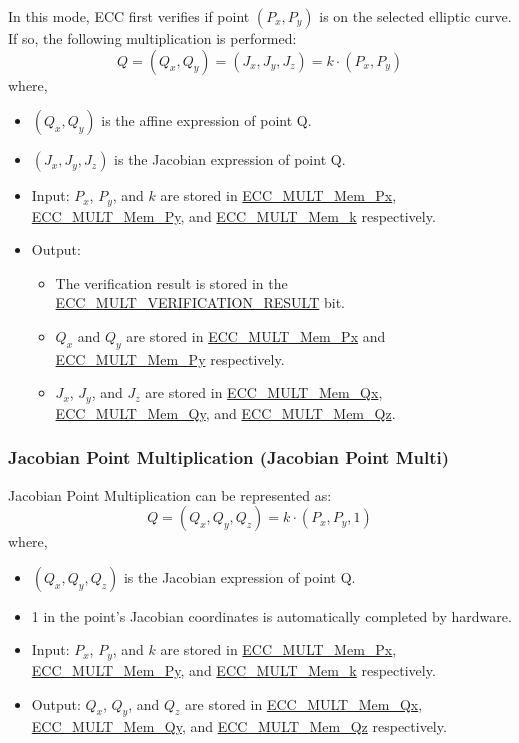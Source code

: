 \documentclass[main\_\_EN.tex]{subfiles}
\begin{document}
In this mode, ECC first verifies if point $(P_x,P_y)$ is on the selected elliptic curve. If so, the following multiplication is performed:
\[
Q = (Q_x,Q_y) = (J_x,J_y,J_z) = k \cdot (P_x,P_y)
\]
where,
\begin{itemize}
    \item $(Q_x,Q_y)$ is the affine expression of point Q.
    \item $(J_x,J_y,J_z)$ is the Jacobian expression of point Q.
    \item Input: $P_x$, $P_y$, and $k$ are stored in \hyperref[tab:ecc-memory]{ECC\_MULT\_Mem\_Px}, \hyperref[tab:ecc-memory]{ECC\_MULT\_Mem\_Py}, and \hyperref[tab:ecc-memory]{ECC\_MULT\_Mem\_k} respectively.
    \item Output:
    \begin{itemize}
        \item The verification result is stored in the \hyperref[fielddesc:ECCMULTVERIFICATIONRESULT]{ECC\_MULT\_VERIFICATION\_RESULT} bit.
        \item $Q_x$ and $Q_y$ are stored in \hyperref[tab:ecc-memory]{ECC\_MULT\_Mem\_Px} and \hyperref[tab:ecc-memory]{ECC\_MULT\_Mem\_Py} respectively.
        \item $J_x$, $J_y$, and $J_z$ are stored in \hyperref[tab:ecc-memory]{ECC\_MULT\_Mem\_Qx}, \hyperref[tab:ecc-memory]{ECC\_MULT\_Mem\_Qy}, and \hyperref[tab:ecc-memory]{ECC\_MULT\_Mem\_Qz}.
    \end{itemize}
\end{itemize}

\subsubsection{Jacobian Point Multiplication (Jacobian Point Multi)}

Jacobian Point Multiplication can be represented as:
\[
Q = (Q_x,Q_y,Q_z) = k \cdot (P_x,P_y,1)
\]
where,
\begin{itemize}
    \item $(Q_x,Q_y,Q_z)$ is the Jacobian expression of point Q.
    \item 1 in the point's Jacobian coordinates is automatically completed by hardware.
    \item Input: $P_x$, $P_y$, and $k$ are stored in \hyperref[tab:ecc-memory]{ECC\_MULT\_Mem\_Px}, \hyperref[tab:ecc-memory]{ECC\_MULT\_Mem\_Py}, and \hyperref[tab:ecc-memory]{ECC\_MULT\_Mem\_k} respectively.
    \item Output: $Q_x$, $Q_y$, and $Q_z$ are stored in \hyperref[tab:ecc-memory]{ECC\_MULT\_Mem\_Qx}, \hyperref[tab:ecc-memory]{ECC\_MULT\_Mem\_Qy}, and \hyperref[tab:ecc-memory]{ECC\_MULT\_Mem\_Qz} respectively.
\end{itemize}
\end{document}
